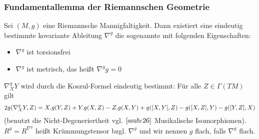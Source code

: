 \subsubsection{Fundamentallemma der Riemannschen Geometrie}
\label{ssub:220}
Sei $(M,g)$ eine Riemannsche Mannigfaltigkeit. Dann existiert eine eindeutig bestimmte kovariante Ableitung $\nabla^g$ die sogenannte  mit folgenden Eigenschaften:
\begin{itemize}
\item $\nabla^g$ ist torsionsfrei
\item $\nabla^g$ ist metrisch, das heißt $\nabla^g g = 0$
\end{itemize}
$\nabla^g_X Y$ wird durch die Koszul-Formel eindeutig bestimmt: Für alle $Z\in \Gamma(TM)$ gilt 
\[
2g(\nabla^g_X Y,Z) = X.g(Y,Z) + Y.g(X,Z) - Z.g(X,Y) + g([X,Y],Z) - g([X,Z],Y) - g([Y,Z],X)
\]
(benutzt die Nicht-Degeneriertheit vgl. $\ref{ssub:26}$ Musikalische Isomorphismen).\\
$R^g = R^{\nabla^g}$ heißt Krümmungstensor bzgl. $\nabla^g$ und wir nennen $g$ flach, falls $\nabla^g$ flach.
